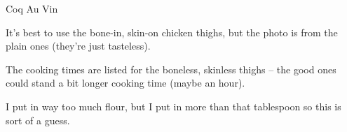 \documentclass{recipe}
\begin{document}
\begin{recipe}{Coq Au Vin}
  \begin{notes}
  \item It's best to use the bone-in, skin-on chicken thighs, but the
    photo is from the plain ones (they're just tasteless).
  \item The cooking times are listed for the boneless, skinless thighs
    -- the good ones could stand a bit longer cooking time (maybe an
    hour).
  \item I put in way too much flour, but I put in more than that
    tablespoon so this is sort of a guess.
  \end{notes}
\end{recipe}
\end{document}
